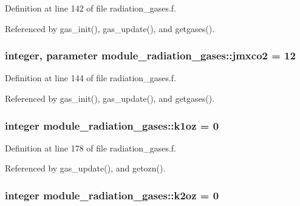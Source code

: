 Definition at line 142 of file radiation\+\_\+gases.\+f.



Referenced by gas\+\_\+init(), gas\+\_\+update(), and getgases().

\subsubsection[{\texorpdfstring{jmxco2}{jmxco2}}]{\setlength{\rightskip}{0pt plus 5cm}integer, parameter module\+\_\+radiation\+\_\+gases\+::jmxco2 = 12\hspace{0.3cm}{\ttfamily [private]}}\hypertarget{group__module__radiation__gases_gaa56e209872093bfcbdaeb452f5e5e332}{}\label{group__module__radiation__gases_gaa56e209872093bfcbdaeb452f5e5e332}


Definition at line 144 of file radiation\+\_\+gases.\+f.



Referenced by gas\+\_\+init(), gas\+\_\+update(), and getgases().

\subsubsection[{\texorpdfstring{k1oz}{k1oz}}]{\setlength{\rightskip}{0pt plus 5cm}integer module\+\_\+radiation\+\_\+gases\+::k1oz = 0\hspace{0.3cm}{\ttfamily [private]}}\hypertarget{group__module__radiation__gases_ga0a14666484f230d3506a9b4740e2eeda}{}\label{group__module__radiation__gases_ga0a14666484f230d3506a9b4740e2eeda}


Definition at line 178 of file radiation\+\_\+gases.\+f.



Referenced by gas\+\_\+update(), and getozn().

\subsubsection[{\texorpdfstring{k2oz}{k2oz}}]{\setlength{\rightskip}{0pt plus 5cm}integer module\+\_\+radiation\+\_\+gases\+::k2oz = 0\hspace{0.3cm}{\ttfamily [private]}}\hypertarget{group__module__radiation__gases_ga0c3727c9e2a0bec46e84622c4591cd8b}{}\label{group__module__radiation__gases_ga0c3727c9e2a0bec46e84622c4591cd8b}


